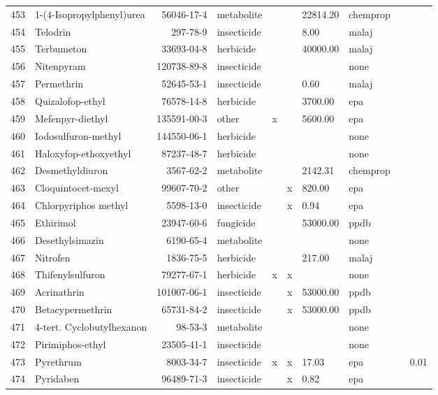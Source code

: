 \begin{longtable}{lp{3cm}rlp{0.5cm}p{0.5cm}p{1.5cm}p{1cm}p{1cm}p{1cm}}
  453 & 1-(4-Isopropylphenyl)urea & 56046-17-4 & metabolite &  &  & 22814.20 & chemprop &  &  \\ 
  454 & Telodrin & 297-78-9 & insecticide &  &  & 8.00 & malaj &  &  \\ 
  455 & Terbumeton & 33693-04-8 & herbicide &  &  & 40000.00 & malaj &  &  \\ 
  456 & Nitenpyram & 120738-89-8 & insecticide &  &  &  & none &  &  \\ 
  457 & Permethrin & 52645-53-1 & insecticide &  &  & 0.60 & malaj &  &  \\ 
  458 & Quizalofop-ethyl & 76578-14-8 & herbicide &  &  & 3700.00 & epa &  &  \\ 
  459 & Mefenpyr-diethyl & 135591-00-3 & other & x &  & 5600.00 & epa &  &  \\ 
  460 & Iodosulfuron-methyl & 144550-06-1 & herbicide &  &  &  & none &  &  \\ 
  461 & Haloxyfop-ethoxyethyl & 87237-48-7 & herbicide &  &  &  & none &  &  \\ 
  462 & Desmethyldiuron & 3567-62-2 & metabolite &  &  & 2142.31 & chemprop &  &  \\ 
  463 & Cloquintocet-mexyl & 99607-70-2 & other &  & x & 820.00 & epa &  &  \\ 
  464 & Chlorpyriphos methyl & 5598-13-0 & insecticide &  & x & 0.94 & epa &  &  \\ 
  465 & Ethirimol & 23947-60-6 & fungicide &  &  & 53000.00 & ppdb &  &  \\ 
  466 & Desethylsimazin & 6190-65-4 & metabolite &  &  &  & none &  &  \\ 
  467 & Nitrofen & 1836-75-5 & herbicide &  &  & 217.00 & malaj &  &  \\ 
  468 & Thifenylsulfuron & 79277-67-1 & herbicide & x & x &  & none &  &  \\ 
  469 & Acrinathrin & 101007-06-1 & insecticide &  & x & 53000.00 & ppdb &  &  \\ 
  470 & Betacypermethrin & 65731-84-2 & insecticide &  & x & 53000.00 & ppdb &  &  \\ 
  471 & 4-tert. Cyclobutylhexanon & 98-53-3 & metabolite &  &  &  & none &  &  \\ 
  472 & Pirimiphos-ethyl & 23505-41-1 & insecticide &  &  &  & none &  &  \\ 
  473 & Pyrethrum & 8003-34-7 & insecticide & x & x & 17.03 & epa &  & 0.01 \\ 
  474 & Pyridaben & 96489-71-3 & insecticide &  & x & 0.82 & epa &  &  \\ 

\end{longtable}
